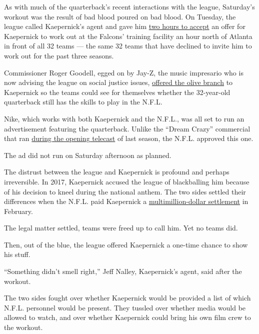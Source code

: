 As with much of the quarterback's recent interactions with the league,
Saturday's workout was the result of bad blood poured on bad blood. On
Tuesday, the league called Kaepernick's agent and gave him
\href{https://www.nytimes3xbfgragh.onion/2019/11/12/sports/football/colin-kaepernick-nfl-workout.html}{two
hours to accept} an offer for Kaepernick to work out at the Falcons'
training facility an hour north of Atlanta in front of all 32 teams ---
the same 32 teams that have declined to invite him to work out for the
past three seasons.

Commissioner Roger Goodell, egged on by Jay-Z, the music impresario who
is now advising the league on social justice issues,
\href{https://www.nytimes3xbfgragh.onion/2019/11/15/sports/football/kaepernick-jay-z.html}{offered
the olive branch} to Kaepernick so the teams could see for themselves
whether the 32-year-old quarterback still has the skills to play in the
N.F.L.

Nike, which works with both Kaepernick and the N.F.L., was all set to
run an advertisement featuring the quarterback. Unlike the ``Dream
Crazy'' commercial that ran
\href{https://mailtrack.io/trace/link/2475e9e4187c233e10656adb8279299471bfd1b1?notrack=1\&url=https\%3A\%2F\%2Fwww.nytimes3xbfgragh.onion\%2F2018\%2F09\%2F05\%2Fsports\%2Fcolin-kaepernick-nike.html\&userId=3621650\&signature=cd85d3a79202475f}{during
the opening telecast} of last season, the N.F.L. approved this one.

The ad did not run on Saturday afternoon as planned.

The distrust between the league and Kaepernick is profound and perhaps
irreversible. In 2017, Kaepernick accused the league of blackballing him
because of his decision to kneel during the national anthem. The two
sides settled their differences when the N.F.L. paid Kaepernick a
\href{https://www.nytimes3xbfgragh.onion/2019/03/21/sports/colin-kaepernick-nfl-settlement.html}{multimillion-dollar
settlement} in February.

The legal matter settled, teams were freed up to call him. Yet no teams
did.

Then, out of the blue, the league offered Kaepernick a one-time chance
to show his stuff.

``Something didn't smell right,'' Jeff Nalley, Kaepernick's agent, said
after the workout.

The two sides fought over whether Kaepernick would be provided a list of
which N.F.L. personnel would be present. They tussled over whether media
would be allowed to watch, and over whether Kaepernick could bring his
own film crew to the workout.

